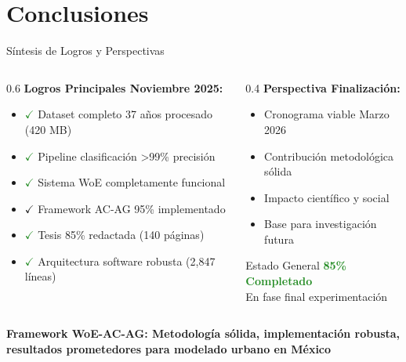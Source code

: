 \documentclass[aspectratio=169]{beamer}
\begin{document}
\section{Conclusiones}

\begin{frame}{Síntesis de Logros y Perspectivas}
  \begin{columns}
    \begin{column}{0.6\textwidth}
      \textbf{Logros Principales Noviembre 2025:}
      \begin{itemize}
        \item \textcolor{ForestGreen}{\textbf{$\checkmark$}} Dataset completo 37 años procesado (420 MB)
        \item \textcolor{ForestGreen}{\textbf{$\checkmark$}} Pipeline clasificación >99\% precisión  
        \item \textcolor{ForestGreen}{\textbf{$\checkmark$}} Sistema WoE completamente funcional
        \item \textcolor{UNAMBlue}{\textbf{$\checkmark$}} Framework AC-AG 95\% implementado
        \item \textcolor{ForestGreen}{\textbf{$\checkmark$}} Tesis 85\% redactada (140 páginas)
        \item \textcolor{ForestGreen}{\textbf{$\checkmark$}} Arquitectura software robusta (2,847 líneas)
      \end{itemize}
    \end{column}
    \begin{column}{0.4\textwidth}
      \textbf{Perspectiva Finalización:}
      \begin{itemize}
        \item Cronograma viable Marzo 2026
        \item Contribución metodológica sólida  
        \item Impacto científico y social
        \item Base para investigación futura
      \end{itemize}
      
      \vspace{0.3cm}
      \begin{alertblock}{Estado General}
      \textcolor{ForestGreen}{\textbf{85\% Completado}} \\
      En fase final experimentación
      \end{alertblock}
    \end{column}
  \end{columns}
  
  \vspace{0.4cm}
  \begin{center}
  \Large
  \textcolor{UNAMBlue}{\textbf{Framework WoE-AC-AG: Metodología sólida, implementación robusta, 
  resultados prometedores para modelado urbano en México}}
  \end{center}
\end{frame}
\end{document}
